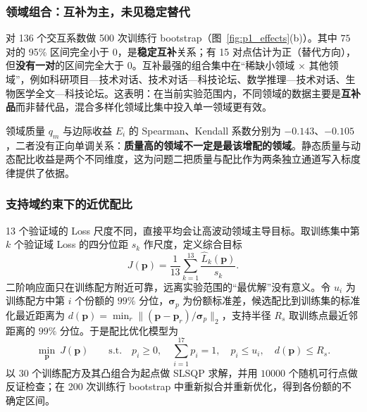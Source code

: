 \subsubsection{领域组合：互补为主，未见稳定替代}

对 136 个交互系数做 500 次训练行 bootstrap（图~\ref{fig:p1_effects}(b)）。其中 $75$ 对的 95\% 区间完全小于 0，是\textbf{稳定互补}关系；有 15 对点估计为正（替代方向），但\textbf{没有一对}的区间完全大于 0。互补最强的组合集中在“稀缺小领域 × 其他领域”，例如科研项目—技术对话、技术对话—科技论坛、数学推理—技术对话、生物医学全文—科技论坛。这表明：在当前实验范围内，不同领域的数据主要是\textbf{互补品}而非替代品，混合多样化领域比集中投入单一领域更有效。

领域质量 $q_m$ 与边际收益 $E_i$ 的 Spearman、Kendall 系数分别为 $-0.143$、$-0.105$，二者没有正向单调关系：\textbf{质量高的领域不一定是最该增配的领域}。静态质量与动态配比收益是两个不同维度，这为问题二把质量与配比作为两条独立通道写入标度律提供了依据。

\subsubsection{支持域约束下的近优配比}

13 个验证域的 Loss 尺度不同，直接平均会让高波动领域主导目标。取训练集中第 $k$ 个验证域 Loss 的四分位距 $s_k$ 作尺度，定义综合目标
\begin{equation}
J(\boldsymbol p)=\frac1{13}\sum_{k=1}^{13}\frac{\widehat L_k(\boldsymbol p)}{s_k}.
\label{eq:p1_J}
\end{equation}
二阶响应面只在训练配方附近可靠，远离实验范围的“最优解”没有意义。令 $u_i$ 为训练配方中第 $i$ 个份额的 $99\%$ 分位，$\boldsymbol\sigma_p$ 为份额标准差，候选配比到训练集的标准化最近距离为 $d(\boldsymbol p)=\min_r\|(\boldsymbol p-\boldsymbol p_r)/\boldsymbol\sigma_p\|_2$，支持半径 $R_s$ 取训练点最近邻距离的 $99\%$ 分位。于是配比优化模型为
\begin{equation}
\min_{\boldsymbol p}\ J(\boldsymbol p)\qquad
\text{s.t.}\quad p_i\ge0,\quad \sum_{i=1}^{17}p_i=1,\quad p_i\le u_i,\quad d(\boldsymbol p)\le R_s .
\label{eq:p1_opt}
\end{equation}
以 30 个训练配方及其凸组合为起点做 SLSQP 求解，并用 $10000$ 个随机可行点做反证检查；在 200 次训练行 bootstrap 中重新拟合并重新优化，得到各份额的不确定区间。

